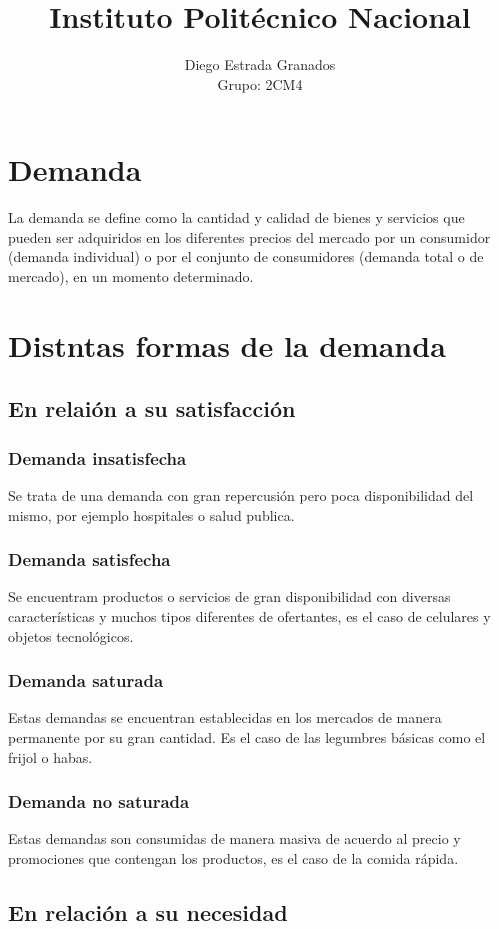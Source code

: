 \documentclass[11pt,letterpaper]{article}
\author{Diego Estrada Granados\\Grupo: 2CM4}
\title{Instituto Politécnico Nacional }
\begin{document}
\maketitle
\section{Demanda}
La demanda se define como la cantidad y calidad de bienes y servicios que pueden ser adquiridos en los diferentes precios del mercado por un consumidor (demanda individual) o por el conjunto de consumidores (demanda total o de mercado), en un momento determinado. 

\section{Distntas formas de la demanda}
\subsection{En relaión a su satisfacción}
\subsubsection*{Demanda insatisfecha}
Se trata de una demanda con gran repercusión pero poca disponibilidad del mismo, por ejemplo hospitales o salud publica.
\subsubsection*{Demanda satisfecha}
Se encuentram  productos o servicios de gran disponibilidad con diversas características y muchos tipos diferentes de ofertantes, es el caso de celulares y objetos tecnológicos.
\subsubsection*{Demanda saturada}
Estas demandas se encuentran establecidas en los mercados de manera permanente por su gran cantidad. Es el caso de las legumbres básicas como el frijol  o habas.
\subsubsection*{Demanda no saturada}
Estas demandas son consumidas de manera masiva de acuerdo al precio y promociones que contengan los productos, es el caso de la comida rápida.
\subsection{En relación a su necesidad}
\end{document}
